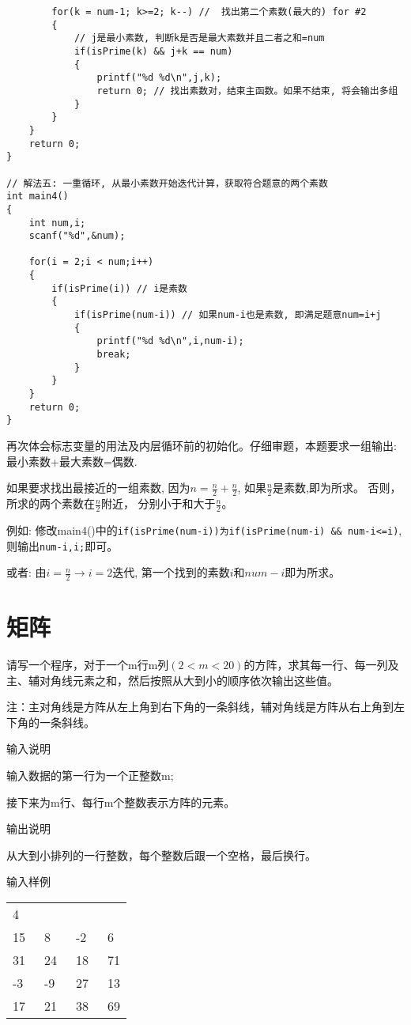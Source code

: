 \begin{lstlisting}
		for(k = num-1; k>=2; k--) //  找出第二个素数(最大的) for #2
		{
			// j是最小素数, 判断k是否是最大素数并且二者之和=num 
			if(isPrime(k) && j+k == num) 
			{
				printf("%d %d\n",j,k);
				return 0; // 找出素数对，结束主函数。如果不结束, 将会输出多组 
			}
		}
	}
	return 0;
}

// 解法五: 一重循环, 从最小素数开始迭代计算，获取符合题意的两个素数 
int main4() 
{ 
	int num,i;
	scanf("%d",&num);
	
	for(i = 2;i < num;i++)
	{
		if(isPrime(i)) // i是素数 
		{
			if(isPrime(num-i)) // 如果num-i也是素数, 即满足题意num=i+j 
			{
				printf("%d %d\n",i,num-i); 
				break;
			} 
		}
	}
	return 0; 
} 
\end{lstlisting}

\begin{note}[要点]
	再次体会标志变量的用法及内层循环前的初始化。仔细审题，本题要求一组输出: 最小素数+最大素数=偶数.
	
	如果要求找出最接近的一组素数, 因为$n=\frac{n}{2}+\frac{n}{2}$, 如果$\frac{n}{2}$是素数,即为所求。 否则，所求的两个素数在$\frac{n}{2}$附近， 分别小于和大于$\frac{n}{2}$。
	
	例如: 修改main4()中的\lstinline|if(isPrime(num-i))为if(isPrime(num-i) && num-i<=i)|, 则输出\lstinline|num-i,i;|即可。 
	
	或者: 由$i=\frac{n}{2}\to i=2$迭代, 第一个找到的素数$i$和$num-i$即为所求。
\end{note}

\section{矩阵}
请写一个程序，对于一个m行m列$(2<m<20)$的方阵，求其每一行、每一列及主、辅对角线元素之和，然后按照从大到小的顺序依次输出这些值。

注：主对角线是方阵从左上角到右下角的一条斜线，辅对角线是方阵从右上角到左下角的一条斜线。

输入说明

输入数据的第一行为一个正整数m;

接下来为m行、每行m个整数表示方阵的元素。

输出说明	

从大到小排列的一行整数，每个整数后跟一个空格，最后换行。

输入样例

\begin{tabular}{llll}
	4&&&\\
	15  &~8   &~-2   &~6\\
	31  &~24  &~18  &~71\\
	-3  &~-9  &~27  &~13\\
	17  &~21  &~38  &~69
\end{tabular}

